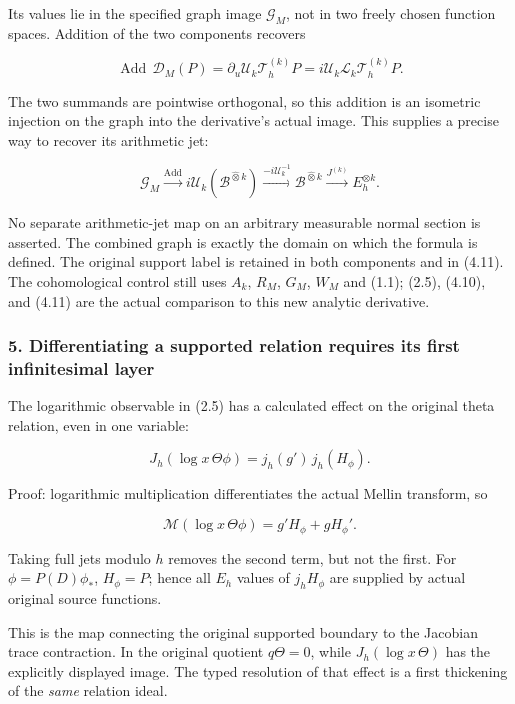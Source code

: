 Its values lie in the specified graph image \(\mathscr G_M\), not in two
freely chosen function spaces. Addition of the two components recovers

\[\operatorname{Add}\,\mathscr D_M(P)=\partial_u\mathscr U_k\mathcal T_h^{(k)}P=i\mathscr U_k\mathscr L_k\mathcal T_h^{(k)}P.\tag{4.10}\]

The two summands are pointwise orthogonal, so this addition is an
isometric injection on the graph into the derivative's actual image.
This supplies a precise way to recover its arithmetic jet:

\[\mathscr G_M\xrightarrow{\operatorname{Add}}i\mathscr U_k(\mathscr B^{\widehat\otimes k})
\xrightarrow{-i\mathscr U_k^{-1}}\mathscr B^{\widehat\otimes k}\xrightarrow{J^{(k)}}E_h^{\otimes k}.\tag{4.11}\]

No separate arithmetic-jet map on an arbitrary measurable normal section
is asserted. The combined graph is exactly the domain on which the
formula is defined. The original support label is retained in both
components and in (4.11). The cohomological control still uses \(A_k\),
\(R_M\), \(G_M\), \(W_M\) and (1.1); (2.5), (4.10), and (4.11) are the
actual comparison to this new analytic derivative.

\subsubsection{5. Differentiating a supported relation requires its first
infinitesimal
layer}\label{sum_connection:differentiating-a-supported-relation-requires-its-first-infinitesimal-layer}

The logarithmic observable in (2.5) has a calculated effect on the
original theta relation, even in one variable:

\[\boxed{J_h(\log x\,\Theta\phi)=j_h(g')\,j_h(H_\phi).}\tag{5.1}\]

Proof: logarithmic multiplication differentiates the actual Mellin
transform, so

\[\mathcal M(\log x\,\Theta\phi)=g'H_\phi+gH_\phi'.\]

Taking full jets modulo \(h\) removes the second term, but not the
first. For \(\phi=P(D)\phi_*\), \(H_\phi=P\); hence all \(E_h\) values
of \(j_hH_\phi\) are supplied by actual original source functions.

This is the map connecting the original supported boundary to the
Jacobian trace contraction. In the original quotient \(q\Theta=0\),
while \(J_h(\log x\,\Theta)\) has the explicitly displayed image. The
typed resolution of that effect is a first thickening of the \emph{same}
relation ideal.

